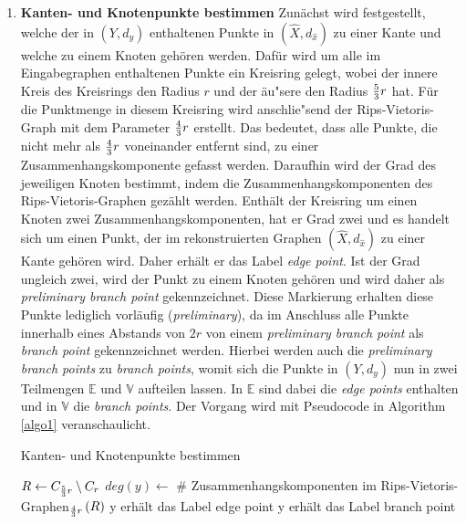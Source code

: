 \documentclass[parskip=half,
 fontsize=12pt, bibtotoc,
 ngerman]
 {article}
\begin{document}
\begin{enumerate}
\item \textbf{Kanten- und Knotenpunkte bestimmen}\newline
Zunächst wird festgestellt, welche der in $\left(Y, d_y\right)$ enthaltenen Punkte in $(\hat{X}, d_{\hat{x}})$ zu einer Kante und welche zu einem Knoten gehören werden. Dafür wird um alle im Eingabegraphen enthaltenen Punkte ein Kreisring gelegt, wobei der innere Kreis des Kreisrings den Radius $r$ und der äu"sere den Radius ${5\over 3}r$ hat. Für die Punktmenge in diesem Kreisring wird anschlie"send der Rips-Vietoris-Graph mit dem Parameter ${4 \over 3}r$ erstellt. Das bedeutet, dass alle Punkte, die nicht mehr als ${4 \over 3}r$ voneinander entfernt sind, zu einer Zusammenhangskomponente gefasst werden. Daraufhin wird der Grad des jeweiligen Knoten bestimmt, indem die Zusammenhangskomponenten des Rips-Vietoris-Graphen gezählt werden. Enthält der Kreisring um einen Knoten zwei Zusammenhangskomponenten, hat er Grad zwei und es handelt sich um einen Punkt, der im rekonstruierten Graphen $(\hat{X}, d_{\hat{x}})$ zu einer Kante gehören wird. Daher erhält er das Label \textit{edge point}. Ist der Grad ungleich zwei, wird der Punkt zu einem Knoten gehören und wird daher als \textit{preliminary branch point} gekennzeichnet.
Diese Markierung erhalten diese Punkte lediglich vorläufig (\textit{preliminary}), da im Anschluss alle Punkte innerhalb eines Abstands von $2r$ von einem \textit{preliminary branch point} als \textit{branch point} gekennzeichnet werden. Hierbei werden auch die \textit{preliminary branch points} zu \textit{branch points}, womit sich die Punkte in $\left(Y, d_y\right)$ nun in zwei Teilmengen $\mathbb{E}$ und $\mathbb{V}$ aufteilen lassen. In $\mathbb{E}$ sind dabei die \textit{edge points} enthalten und in $\mathbb{V}$ die \textit{branch points}. Der Vorgang wird mit Pseudocode in Algorithm \ref{algo1} veranschaulicht. \newline
\begin{algorithm}
\caption{Kanten- und Knotenpunkte bestimmen}\label{algo1}
\begin{algorithmic}
\STATE $R \leftarrow C_{{5\over 3}r} \setminus C_r$ 
\STATE $deg\left(y\right) \leftarrow$ \# Zusammenhangskomponenten im Rips-Vietoris-Graphen$_{{4 \over 3}r}\left(R\right)$
		\STATE y erhält das Label edge point
	\ELSE 
		\STATE y erhält das Label branch point
	\ENDIF
\ENDFOR
{}

\end{algorithmic}
\end{algorithm}
\end{enumerate}
\end{document}
